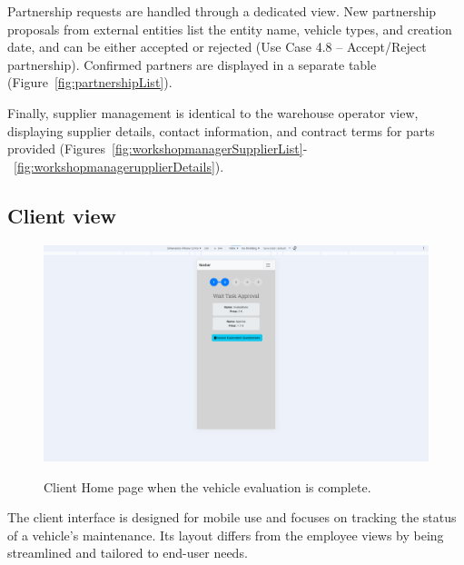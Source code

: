 Partnership requests are handled through a dedicated view. New partnership proposals from external entities list the entity name, vehicle types, and creation date, and can be either accepted or rejected (Use Case 4.8 – Accept/Reject partnership). Confirmed partners are displayed in a separate table (Figure~\ref{fig:partnershipList}).

Finally, supplier management is identical to the warehouse operator view, displaying supplier details, contact information, and contract terms for parts provided (Figures~\ref{fig:workshopmanagerSupplierList}-~\ref{fig:workshopmanagerupplierDetails}).



\subsection{Client view}

\begin{figure}[h]
  \caption{Client Home page when the vehicle evaluation is complete.}
  \centering
  \includegraphics[width=\textwidth]{figs/Implementation/client/MaintenanceState2}
  \label{fig:MaintenanceState2}
\end{figure}


The client interface is designed for mobile use and focuses on tracking the status of a vehicle's maintenance. Its layout differs from the employee views by being streamlined and tailored to end-user needs.




